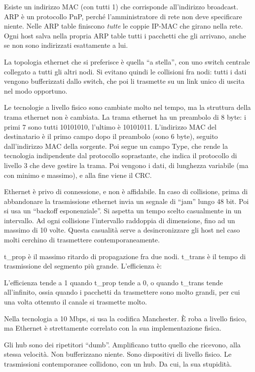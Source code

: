 Esiste un indirizzo MAC (con tutti 1) che corrisponde all'indirizzo broadcast. ARP \`e un protocollo PnP, perch\'e l'amministratore di rete non deve specificare niente. Nelle ARP table finiscono \emph{tutte} le coppie IP-MAC che girano nella rete. Ogni host salva nella propria ARP table tutti i pacchetti che gli arrivano, anche se non sono indirizzati esattamente a lui.

La topologia ethernet che si preferisce \`e quella ``a stella'', con uno switch centrale collegato a tutti gli altri nodi. Si evitano quindi le collisioni fra nodi: tutti i dati vengono bufferizzati dallo switch, che poi li trasmette su un link unico di uscita nel modo opportuno.

Le tecnologie a livello fisico sono cambiate molto nel tempo, ma la struttura della trama ethernet non \`e cambiata. La trama ethernet ha un preambolo di 8 byte: i primi 7 sono tutti 10101010, l'ultimo \`e 10101011. L'indirizzo MAC del destinatario \`e il primo campo dopo il preambolo (sono 6 byte), seguito dall'indirizzo MAC della sorgente. Poi segue un campo Type, che rende la tecnologia indipendente dal protocollo soprastante, che indica il protocollo di livello 3 che deve gestire la trama. Poi vengono i dati, di lunghezza variabile (ma con minimo e massimo), e alla fine viene il CRC.

Ethernet \`e privo di connessione, e non \`e affidabile. In caso di collisione, prima di abbandonare la trasmissione ethernet invia un segnale di ``jam'' lungo 48 bit. Poi si usa un ``backoff esponenziale''. Si aspetta un tempo scelto casualmente in un intervallo. Ad ogni collisione l'intervallo raddoppia di dimensione, fino ad un massimo di 10 volte. Questa casualit\`a serve a desincronizzare gli host nel caso molti cerchino di trasmettere contemporaneamente.

t_{prop} \`e il massimo ritardo di propagazione fra due nodi. t_{trans} \`e il tempo di trasmissione del segmento pi\`u grande. L'efficienza \`e:


L'efficienza tende a 1 quando t_{prop} tende a 0, o quando t_{trans} tende all'infinito, ossia quando i pacchetti da trasmettere sono molto grandi, per cui una volta ottenuto il canale si trasmette molto.

Nella tecnologia a 10 Mbps, si usa la codifica Manchester. \`E roba a livello fisico, ma Ethernet \`e strettamente correlato con la sua implementazione fisica.

Gli hub sono dei ripetitori ``dumb''. Amplificano tutto quello che ricevono, alla stessa velocit\`a. Non bufferizzano niente. Sono dispositivi di livello fisico. Le trasmissioni contemporanee collidono, con un hub. Da cui, la sua stupidit\`a.


